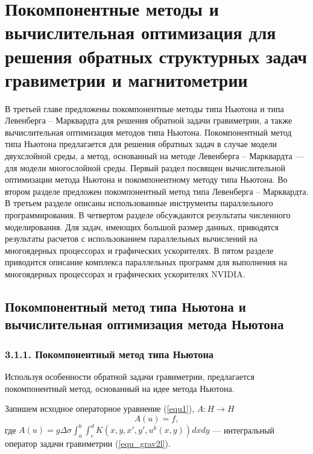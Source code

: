 \chapter{Покомпонентные методы и вычислительная оптимизация для решения обратных структурных задач гравиметрии и магнитометрии}

В третьей главе предложены покомпонентные методы типа Ньютона и типа Левенберга -- Марквардта для решения обратной задачи гравиметрии, а также вычислительная оптимизация методов типа Ньютона. Покомпонентный метод типа Ньютона предлагается для решения обратных задач в случае модели двухслойной среды, а метод, основанный на методе Левенберга -- Марквардта --- для модели многослойной среды. Первый раздел посвящен вычислительной оптимизации метода Ньютона и покомпонентному методу типа Ньютона. Во втором разделе предложен покомпонентный метод типа Левенберга -- Марквардта. В третьем разделе описаны использованные инструменты параллельного программирования. В четвертом разделе обсуждаются результаты численного моделирования. Для задач, имеющих большой размер данных, приводятся результаты расчетов с использованием параллельных вычислений на многоядерных процессорах и графических ускорителях. В пятом разделе приводится описание комплекса параллельных программ для выполнения на многоядерных процессорах и графических ускорителях NVIDIA.

\newpage

\section{Покомпонентный метод типа Ньютона и вычислительная оптимизация метода Ньютона}

\subsection*{3.1.1. Покомпонентный метод типа Ньютона}

Используя особенности обратной задачи гравиметрии, предлагается покомпонентный метод, основанный на идее метода Ньютона.

Запишем исходное операторное уравнение (\ref{equ1}), $A: H\to H$
$$A(u)=f,$$
где $A(u)=g\Delta\sigma\int_{a}^{b}\int_{c}^{d}K(x,y, x',y',u^k(x,y))dxdy$ --- интегральный оператор задачи гравиметрии (\ref{equ_grav2l}).

